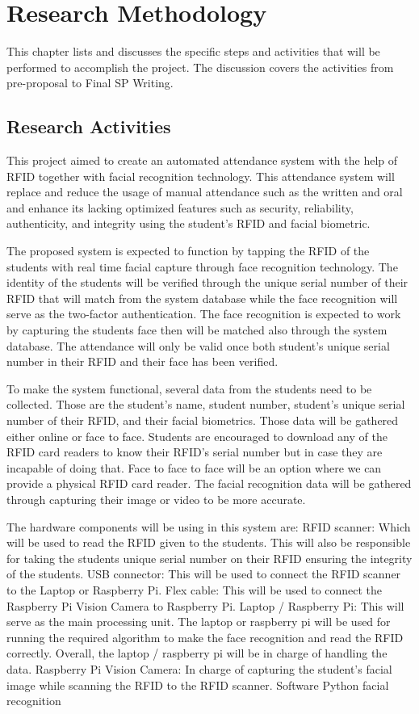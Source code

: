 \chapter{Research Methodology}
This chapter lists and discusses the specific steps and activities that will be performed  to accomplish the project. 
The discussion covers the activities from pre-proposal to Final SP Writing.

\section{Research Activities}
This project aimed to create an automated attendance system with the help of RFID together with facial recognition technology. This attendance system will replace and reduce the usage of manual attendance such as the written and oral and enhance its lacking optimized features such as security, reliability, authenticity, and integrity using the student’s RFID and facial biometric.

The proposed system is expected to function by tapping the RFID of the students with real time facial capture through face recognition technology. The identity of the students will be verified through the unique serial number of their RFID that will match from the system database while the face recognition will serve as the two-factor authentication. The face recognition is expected to work by capturing the students face then will be matched also through the system database. The attendance will only be valid once both student’s unique serial number in their RFID and their face has been verified.

To make the system functional, several data from the students need to be collected. Those are the student’s name, student number, student’s unique serial number of  their RFID, and their facial biometrics. Those data will be gathered either online or face to face. Students are encouraged to download any of the RFID card readers to know their RFID’s serial number but in case they are incapable of doing that. Face to face to face will be an option where we can provide a physical RFID card reader. The facial recognition data will be gathered through capturing their image or video to be more accurate. 

The hardware components will be using in this system are:
RFID scanner: Which will be used to read the RFID given to the students. This will also be responsible for taking the students unique serial number on their RFID ensuring the integrity of the students.
USB connector: This will be used to connect the RFID scanner to the Laptop or Raspberry Pi. Flex cable: This will be used to connect the Raspberry Pi Vision Camera to Raspberry Pi.
Laptop / Raspberry Pi: This will serve as the main processing unit. The laptop or raspberry pi will be used for running the required algorithm to make the face recognition and read the RFID correctly. Overall, the laptop / raspberry pi will be in charge of handling the data.
Raspberry Pi Vision Camera: In charge of capturing the student’s facial image while scanning the RFID to the RFID scanner. 
Software
Python facial recognition


